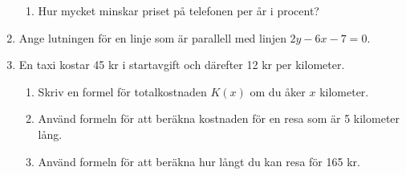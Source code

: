 \documentclass[a4paper,11pt]{article}
\begin{document}
\begin{enumerate}[label=\textbf{\arabic*.}]
\begin{enumerate}[label=\alph*)]
      \item Hur mycket minskar priset på telefonen per år i procent?
    \end{enumerate}
    \item Ange lutningen för en linje som är parallell med linjen $2y-6x-7=0$.
    \item En taxi kostar 45 kr i startavgift och därefter 12 kr per kilometer. 
    \begin{enumerate}[label=\alph*)]
      \item Skriv en formel för totalkostnaden $K(x)$ om du åker $x$ kilometer.
      \item Använd formeln för att beräkna kostnaden för en resa som är 5 kilometer lång.
      \item Använd formeln för att beräkna hur långt du kan resa för 165 kr.
    \end{enumerate}
    \end{enumerate}
\end{document}
